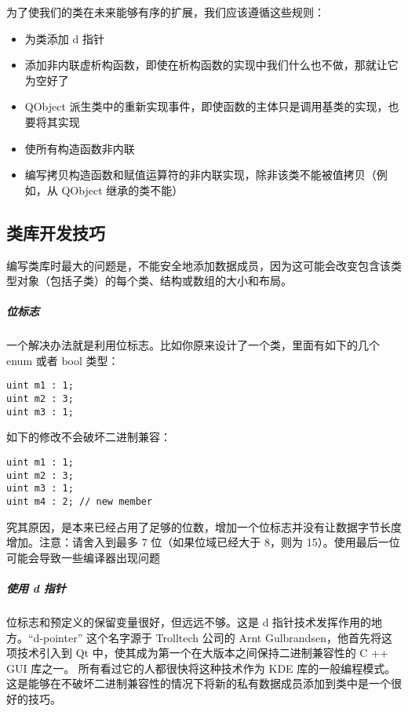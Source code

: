为了使我们的类在未来能够有序的扩展，我们应该遵循这些规则：

\begin{itemize}

\item
  为类添加 d 指针
\item
  添加非内联虚析构函数，即使在析构函数的实现中我们什么也不做，那就让它为空好了
\item
  QObject
  派生类中的重新实现事件，即使函数的主体只是调用基类的实现，也要将其实现
\item
  使所有构造函数非内联
\item
  编写拷贝构造函数和赋值运算符的非内联实现，除非该类不能被值拷贝（例如，从
  QObject 继承的类不能）
\end{itemize}

\subsection{类库开发技巧}\label{ux7c7bux5e93ux5f00ux53d1ux6280ux5de7}

编写类库时最大的问题是，不能安全地添加数据成员，因为这可能会改变包含该类型对象（包括子类）的每个类、结构或数组的大小和布局。

\subparagraph{位标志}\label{ux4f4dux6807ux5fd7}

一个解决办法就是利用位标志。比如你原来设计了一个类，里面有如下的几个
enum 或者 bool 类型：

\begin{lstlisting}
uint m1 : 1;
uint m2 : 3;
uint m3 : 1;
\end{lstlisting}

如下的修改不会破坏二进制兼容：

\begin{lstlisting}
uint m1 : 1;
uint m2 : 3;
uint m3 : 1;
uint m4 : 2; // new member
\end{lstlisting}

究其原因，是本来已经占用了足够的位数，增加一个位标志并没有让数据字节长度增加。注意：请舍入到最多
7 位（如果位域已经大于 8，则为
15）。使用最后一位可能会导致一些编译器出现问题

\subparagraph{使用 d 指针}\label{ux4f7fux7528-d-ux6307ux9488}

位标志和预定义的保留变量很好，但远远不够。这是 d
指针技术发挥作用的地方。``d-pointer'' 这个名字源于 Trolltech 公司的 Arnt
Gulbrandsen，他首先将这项技术引入到 Qt
中，使其成为第一个在大版本之间保持二进制兼容性的 C ++ GUI 库之一。
所有看过它的人都很快将这种技术作为 KDE
库的一般编程模式。这是能够在不破坏二进制兼容性的情况下将新的私有数据成员添加到类中是一个很好的技巧。

